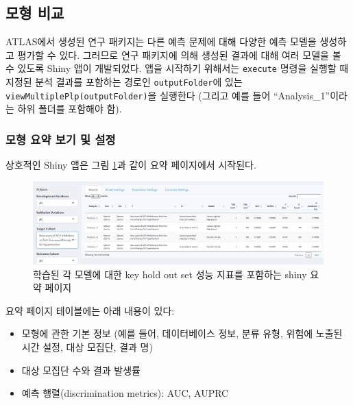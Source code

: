 \documentclass[11pt]{book}
\providecommand{\tightlist}{%
  \setlength{\itemsep}{0pt}\setlength{\parskip}{0pt}}
\theoremstyle{definition}
\theoremstyle{definition}
\theoremstyle{definition}
\theoremstyle{remark}
\begin{document}
\subsection{모형 비교}\label{-}

ATLAS에서 생성된 연구 패키지는 다른 예측 문제에 대해 다양한 예측 모델을
생성하고 평가할 수 있다. 그러므로 연구 패키지에 의해 생성된 결과에 대해
여러 모델을 볼 수 있도록 Shiny 앱이 개발되었다. 앱을 시작하기 위해서는
\texttt{execute} 명령을 실행할 때 지정된 분석 결과를 포함하는 경로인
\texttt{outputFolder}에 있는 \texttt{viewMultiplePlp(outputFolder)}을
실행한다 (그리고 예를 들어 ``Analysis\_1''이라는 하위 폴더를 포함해야
함).

\subsubsection*{모형 요약 보기 및 설정}\label{----}

상호적인 Shiny 앱은 그림 \ref{fig:multiShinySummary}과 같이 요약
페이지에서 시작된다.

\begin{figure}

{\centering \includegraphics[width=1\linewidth]{images/PatientLevelPrediction/shiny/shinyFilter} 

}

\caption{학습된 각 모델에 대한 key hold out set 성능 지표를 포함하는 shiny 요약 페이지}\label{fig:multiShinySummary}
\end{figure}

요약 페이지 테이블에는 아래 내용이 있다:

\begin{itemize}
\tightlist
\item
  모형에 관한 기본 정보 (예를 들어, 데이터베이스 정보, 분류 유형, 위험에
  노출된 시간 설정, 대상 모집단, 결과 명)
\item
  대상 모집단 수와 결과 발생률
\item
  예측 행렬(discrimination metrics): AUC, AUPRC
\end{itemize}
\end{document}
